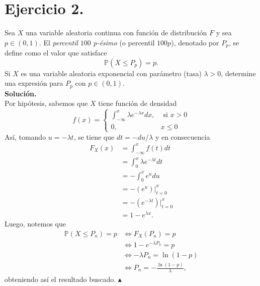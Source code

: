 \documentclass[12pt,a4paper]{article}
\theoremstyle{plain}
\theoremstyle{definition}
\theoremstyle{remark}
\renewcommand{\P}{\mathbb{P}}
\begin{document}
\section*{Ejercicio 2.}
Sea $X$ una variable aleatoria continua con función de distribución $F$ y sea $p \in (0,1)$. El \textit{percentil} $100$ \textit{p-ésimo} (o percentil $100p$), denotado por $P_p$, se define como el valor que satisface
\[
\P(X \leq P_p) = p.
\]
Si $X$ es una variable aleatoria exponencial con parámetro (tasa) $\lambda > 0$, determine una expresión para $P_p$ con $p \in (0, 1)$.\\
\textbf{Solución.} \\
Por hipótesis, sabemos que $X$ tiene función de densidad
\[
f(x)=
\begin{cases}
    \int_{-\infty}^{x}\lambda e^{-\lambda x}dx, &\text{ si } x > 0 \\
    0, &x\leq 0
\end{cases}
\]
Así, tomando $u=-\lambda t$, se tiene que $dt=-du/\lambda$ y en consecuencia
\begin{align*}
    F_X(x) &= \int_{-\infty}^{x}f(t)dt \\
    &= \int_{0}^{x}\lambda e^{-\lambda t}dt \\
    &= -\int_{0}^{x}e^{u}du \\
    &=-\left(e^u\right)\Big|_{t=0}^x \\
    &=-\left(e^{-\lambda t}\right)\Big|_{t=0}^x \\
    &= 1-e^{\lambda x}.
\end{align*}
Luego, notemos que
\begin{align*}
    \P(X\leq P_n)=p &\iff F_X(P_n)=p \\
    &\iff 1-e^{-\lambda P_n}=p \\
    &\iff -\lambda P_n = \ln(1-p) \\
    &\iff P_n = -\frac{\ln(1-p)}{\lambda},
\end{align*}
obteniendo así el resultado buscado. \hfill $\blacktriangle$
\end{document}
